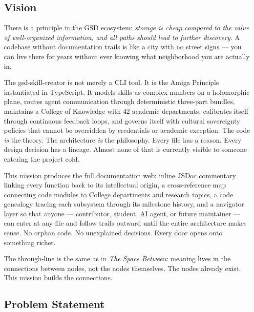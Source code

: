 \documentclass[11pt,letterpaper]{article}
\begin{document}
\subsection{Vision}

There is a principle in the GSD ecosystem: \textit{storage is cheap compared to the value of well-organized information, and all paths should lead to further discovery.} A codebase without documentation trails is like a city with no street signs --- you can live there for years without ever knowing what neighborhood you are actually in.

The gsd-skill-creator is not merely a CLI tool. It is the Amiga Principle instantiated in TypeScript. It models skills as complex numbers on a holomorphic plane, routes agent communication through deterministic three-part bundles, maintains a College of Knowledge with 42 academic departments, calibrates itself through continuous feedback loops, and governs itself with cultural sovereignty policies that cannot be overridden by credentials or academic exception. The code \textit{is} the theory. The architecture \textit{is} the philosophy. Every file has a reason. Every design decision has a lineage. Almost none of that is currently visible to someone entering the project cold.

This mission produces the full documentation web: inline JSDoc commentary linking every function back to its intellectual origin, a cross-reference map connecting code modules to College departments and research topics, a code genealogy tracing each subsystem through its milestone history, and a navigator layer so that anyone --- contributor, student, AI agent, or future maintainer --- can enter at any file and follow trails outward until the entire architecture makes sense. No orphan code. No unexplained decisions. Every door opens onto something richer.

The through-line is the same as in \textit{The Space Between}: meaning lives in the connections between nodes, not the nodes themselves. The nodes already exist. This mission builds the connections.

\subsection{Problem Statement}
\end{document}
